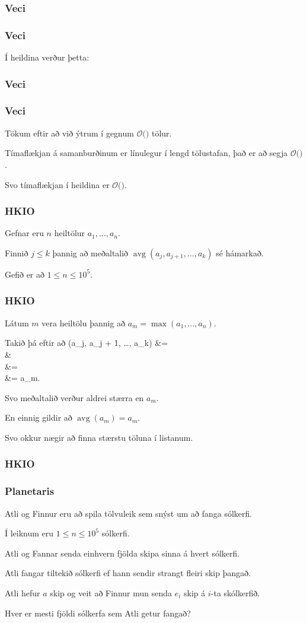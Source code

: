 {
	\frametitle{Veci}
}

{
	\frametitle{Veci}
	{
		\item<1-> Í heildina verður þetta:
	}
}

{
	\frametitle{Veci}
}

{
	\frametitle{Veci}
	{
		\item<1-> Tökum eftir að við ýtrum í gegnum $\mathcal{O}($$)$ tölur.
		\item<3-> Tímaflækjan á samanburðinum er línulegur í lengd tölustafan, það er að segja $\mathcal{O}($\onslide<4->{$\log n$}$)$.
		\item<5-> Svo tímaflækjan í heildina er $\mathcal{O}($\onslide<6->{$n \log n$}$)$.
	}
}

{
	\frametitle{HKIO}
	{
		\item<1-> Gefnar eru $n$ heiltölur $a_1, \dots, a_n$.
		\item<2-> Finnið $j \leq k$ þannig að meðaltalið $\operatorname{avg}(a_j, a_{j + 1}, \dots, a_k)$ sé hámarkað.
		\item<3-> Gefið er að $1 \leq n \leq 10^5$.
	}
}

{
	\frametitle{HKIO}
	{
		\item<1-> Látum $m$ vera heiltölu þannig að $a_m = \max(a_1, \dots, a_n)$.
		\item<2-> Takið þá eftir að 
		{
				(a_j, a_{j + 1}, \dots, a_k)
				&= \\
				&\leq {}\\
				&= \\
				&= a_m.
		}
		\item<3-> Svo meðaltalið verður aldrei stærra en $a_m$.
		\item<4-> En einnig gildir að $\operatorname{avg}(a_m) = a_m$.
		\item<5-> Svo okkur nægir að finna stærstu töluna í listanum.
	}
}

{
	\frametitle{HKIO}
}

{
	\frametitle{Planetaris}
	{
		\item<1-> Atli og Finnur eru að spila tölvuleik sem snýst um að fanga sólkerfi.
		\item<2-> Í leiknum eru $1 \leq n \leq 10^5$ sólkerfi.
		\item<3-> Atli og Fannar senda einhvern fjölda skipa sinna á hvert sólkerfi.
		\item<4-> Atli fangar tiltekið sólkerfi ef hann sendir strangt fleiri skip þangað.
		\item<5-> Atli hefur $a$ skip og veit að Finnur mun senda $e_i$ skip á $i$-ta skólkerfið.
		\item<6-> Hver er mesti fjöldi sólkerfa sem Atli getur fangað?
	}
}

